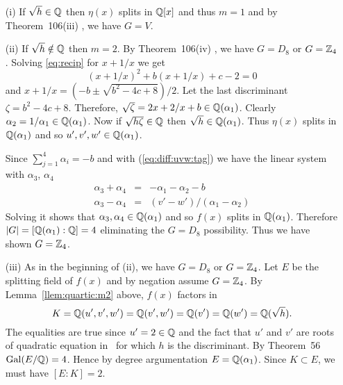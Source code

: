 \begin{myenumerate}
\begin{itemize}
 \item[(i)]
   If \(\sqrt{h}\in \mathbb{Q}\) then \(\eta(x)\) splits in \(\mathbb{Q}[x]\)
   and thus \(m=1\) and by Theorem~106(iii) \cite{Rotman98}, we have \(G=V\).
 \item[(ii)]
   If \(\sqrt{h}\notin \mathbb{Q}\) then \(m=2\).
   By Theorem~106(iv) \cite{Rotman98}, we have \(G=D_8\) or \(G=\mathbb{Z}_4\).
   Solving \ref{eq:recip} for \(x+1/x\)
   we get 
   \begin{equation*}
   (x+1/x)^2 + b(x+1/x) + c - 2 = 0
   \end{equation*}
   and \(x+1/x = (-b \pm\sqrt{b^2 -4c + 8})/2\).
   Let the last discriminant \(\zeta = b^2 -4c + 8\).
   Therefore, \(\sqrt{\zeta} = 2x + 2/x + b \in \mathbb{Q}(\alpha_1)\).
   Clearly \(\alpha_2 = 1/\alpha_1 \in \mathbb{Q}(\alpha_1)\).   
   Now if \(\sqrt{h\zeta}\in \mathbb{Q}\) then \(\sqrt{h}\in \mathbb{Q}(\alpha_1)\).
   Thus \(\eta(x)\) splits in \(\mathbb{Q}(\alpha_1)\) and
   so \(u',v',w'\in\mathbb{Q}(\alpha_1)\).
   
   Since \(\sum_{j=1}^4 \alpha_i = -b\) and with (\ref{eq:diff:uvw:tag})
   we have the linear system with \(\alpha_3\), \(\alpha_4\)
   \begin{eqnarray*}
    \alpha_3 + \alpha_4 & = & -\alpha_1 - \alpha_2 - b\\
    \alpha_3 - \alpha_4 & = & (v' - w')/(\alpha_1 - \alpha_2)
   \end{eqnarray*}
   Solving it shows that \(\alpha_3, \alpha_4\in \mathbb{Q}(\alpha_1)\)
   and so  \(f(x)\) splits in \(\mathbb{Q}(\alpha_1)\).
   Therefore \(|G| = [\mathbb{Q}(\alpha_1):\mathbb{Q}] = 4\) 
   eliminating the \(G=D_8\) possibility. Thus we have shown \(G=\mathbb{Z}_4\).
   
 \item[(iii)]
   As in the beginning of (ii), we have \(G=D_8\) or \(G=\mathbb{Z}_4\).
   Let $E$ be the splitting field of \(f(x)\) and 
   by negation assume  \(G=\mathbb{Z}_4\).
   By Lemma~\ref{llem:quartic:m2} above, \(f(x)\) factors
   in 
   \begin{equation*}
    K = \mathbb{Q}(u',v',w') = \mathbb{Q}(v',w') = \mathbb{Q}(v') = \mathbb{Q}(w') = \mathbb{Q}(\sqrt{h}).
   \end{equation*}
   The equalities are true since \(u'=2\in\mathbb{Q}\)
   and the fact that $u'$ and $v'$ are roots of quadratic equation in \Q\
   for which $h$ is the discriminant.
   By Theorem~56 \cite{Rotman98} \(\mathop{\rm Gal}\nolimits(E/\mathbb{Q}) = 4\).
   Hence by degree argumentation \(E = \mathbb{Q}(\alpha_1)\).
   Since \(K\subset E\), we must have \([E:K] = 2\).


\end{itemize}
\end{myenumerate}
